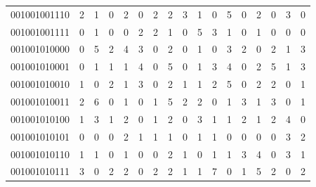\documentclass[10pt,a4paper]{article}
\begin{document}
\begin{longtable}{ |c|c|c|c|c|c|c|c|c|c|c|c|c|c|c|c|c| }
    001001001110              & 2                            & 1                                & 0                            & 2                              & 0   & 2   & 2   & 3   & 1   & 0   & 5   & 0   & 2   & 0   & 3   & 0   \\
    001001001111              & 0                            & 1                                & 0                            & 0                              & 2   & 2   & 1   & 0   & 5   & 3   & 1   & 0   & 1   & 0   & 0   & 0   \\
    001001010000              & 0                            & 5                                & 2                            & 4                              & 3   & 0   & 2   & 0   & 1   & 0   & 3   & 2   & 0   & 2   & 1   & 3   \\
    001001010001              & 0                            & 1                                & 1                            & 1                              & 4   & 0   & 5   & 0   & 1   & 3   & 4   & 0   & 2   & 5   & 1   & 3   \\
    001001010010              & 1                            & 0                                & 2                            & 1                              & 3   & 0   & 2   & 1   & 1   & 2   & 5   & 0   & 2   & 2   & 0   & 1   \\
    001001010011              & 2                            & 6                                & 0                            & 1                              & 0   & 1   & 5   & 2   & 2   & 0   & 1   & 3   & 1   & 3   & 0   & 1   \\
    001001010100              & 1                            & 3                                & 1                            & 2                              & 0   & 1   & 2   & 0   & 3   & 1   & 1   & 2   & 1   & 2   & 4   & 0   \\
    001001010101              & 0                            & 0                                & 0                            & 2                              & 1   & 1   & 1   & 0   & 1   & 1   & 0   & 0   & 0   & 0   & 3   & 2   \\
    001001010110              & 1                            & 1                                & 0                            & 1                              & 0   & 0   & 2   & 1   & 0   & 1   & 1   & 3   & 4   & 0   & 3   & 1   \\
    001001010111              & 3                            & 0                                & 2                            & 2                              & 0   & 2   & 2   & 1   & 1   & 7   & 0   & 1   & 5   & 2   & 0   & 2   \\

\end{longtable}
\end{document}
